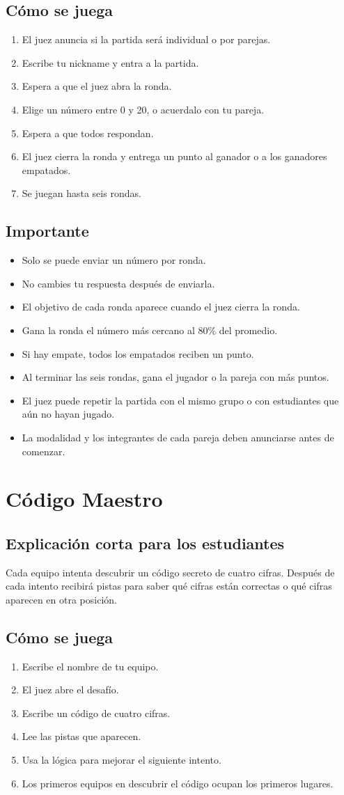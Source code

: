 \documentclass[12pt,a4paper]{article}
\newcommand{\juego}[1]{\section{#1}}
\newcommand{\subtitulo}[1]{\subsection*{#1}}
\begin{document}
\subtitulo{Cómo se juega}
\begin{enumerate}
  \item El juez anuncia si la partida será individual o por parejas.
  \item Escribe tu nickname y entra a la partida.
  \item Espera a que el juez abra la ronda.
  \item Elige un número entre 0 y 20, o acuerdalo con tu pareja.
  \item Espera a que todos respondan.
  \item El juez cierra la ronda y entrega un punto al ganador o a los ganadores empatados.
  \item Se juegan hasta seis rondas.
\end{enumerate}

\subtitulo{Importante}
\begin{itemize}
  \item Solo se puede enviar un número por ronda.
  \item No cambies tu respuesta después de enviarla.
  \item El objetivo de cada ronda aparece cuando el juez cierra la ronda.
  \item Gana la ronda el número más cercano al 80\% del promedio.
  \item Si hay empate, todos los empatados reciben un punto.
  \item Al terminar las seis rondas, gana el jugador o la pareja con más puntos.
  \item El juez puede repetir la partida con el mismo grupo o con estudiantes que aún no hayan jugado.
  \item La modalidad y los integrantes de cada pareja deben anunciarse antes de comenzar.
\end{itemize}

\juego{Código Maestro}

\subtitulo{Explicación corta para los estudiantes}
\begin{tcolorbox}[colback=gris,colframe=dorado]
Cada equipo intenta descubrir un código secreto de cuatro cifras. Después de cada intento recibirá pistas para saber qué cifras están correctas o qué cifras aparecen en otra posición.
\end{tcolorbox}

\subtitulo{Cómo se juega}
\begin{enumerate}
  \item Escribe el nombre de tu equipo.
  \item El juez abre el desafío.
  \item Escribe un código de cuatro cifras.
  \item Lee las pistas que aparecen.
  \item Usa la lógica para mejorar el siguiente intento.
  \item Los primeros equipos en descubrir el código ocupan los primeros lugares.
\end{enumerate}
\end{document}
